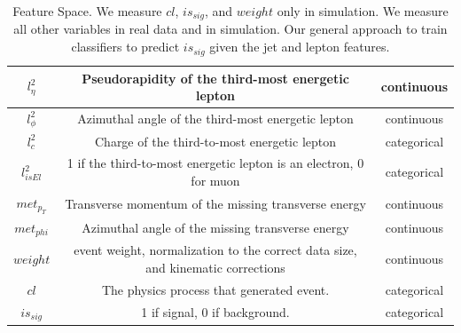 \documentclass[11pt]{article}
\begin{document}
\begin{table}[!htbp]
\begin{center}
\begin{tabular}{|c|c|c|}
\hline
$ l^2_{\eta} $ & Pseudorapidity of the third-most energetic lepton & continuous\\
\hline
$ l^2_{\phi} $ & Azimuthal angle of the third-most energetic lepton & continuous\\
\hline
$ l^2_c $ & Charge of the third-to-most energetic lepton & categorical\\
\hline
$ l^2_{isEl} $ & 1 if the third-to-most energetic lepton is an electron, 0 for muon & categorical\\
\hline
$ met_{p_T} $ & Transverse momentum of the missing transverse energy & continuous\\
\hline
$ met_{phi} $ & Azimuthal angle of the missing transverse energy & continuous\\
\hline
$ weight $ & event weight, normalization to the correct data size, and kinematic corrections & continuous\\
\hline
$ cl $ & The physics process that generated event. & categorical\\
\hline
$ is_{sig} $ & 1 if signal, 0 if background. & categorical\\
\hline
\end{tabular}
\caption{Feature Space. We measure $cl$, $is_{sig}$, and $weight$ only in simulation. We measure all other variables in real data and in simulation. Our general approach to train classifiers to predict $is_{sig}$ given the jet and lepton features.}
\label{data}
\end{center}
\end{table}
\end{document}
